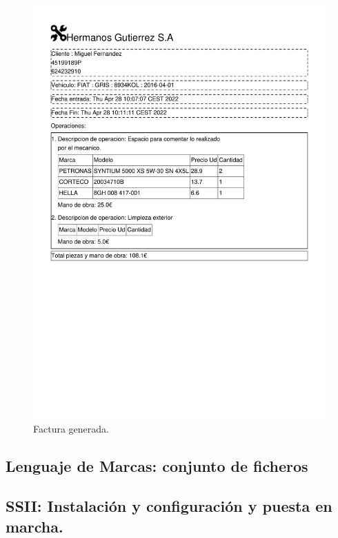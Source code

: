 \documentclass{article}
\begin{document}
  \begin{figure}[H]
    \centering
    \includegraphics[width=1.0\textwidth]{program/capturasEjec/Factura 6.pdf}
    \caption{Factura generada.}
  \end{figure}

\subsection{Lenguaje de Marcas: conjunto de ficheros}
\subsection{SSII: Instalación y configuración y puesta en marcha.} 
\label{subsection:Sistemas}
\end{document}
